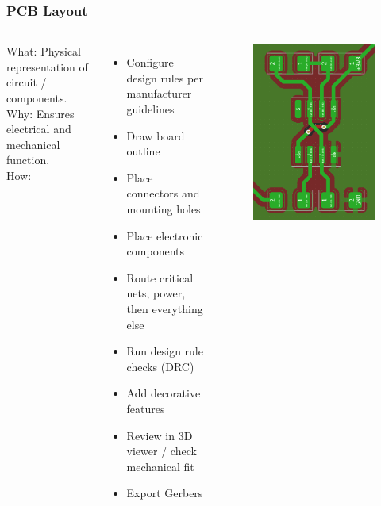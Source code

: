 \documentclass[aspectratio=169, t]{beamer}
\begin{document}
\begin{frame}
\frametitle{PCB Layout}
\begin{columns}
	What: Physical representation of circuit / components.\\
	Why: Ensures electrical and mechanical function.\\
	How:
	\begin{itemize}
		\item Configure design rules per manufacturer guidelines
		\item Draw board outline
		\item Place connectors and mounting holes
		\item Place electronic components
		\item Route critical nets, power, then everything else
		\item Run design rule checks (DRC)
		\item Add decorative features
		\item Review in 3D viewer / check mechanical fit
		\item Export Gerbers
	\end{itemize}
	
	\vspace{-7mm}
	\begin{figure}
		\includegraphics[width=0.8\linewidth]{images/555-layout.png}
	\end{figure}
\end{columns}
\end{frame}
\end{document}
